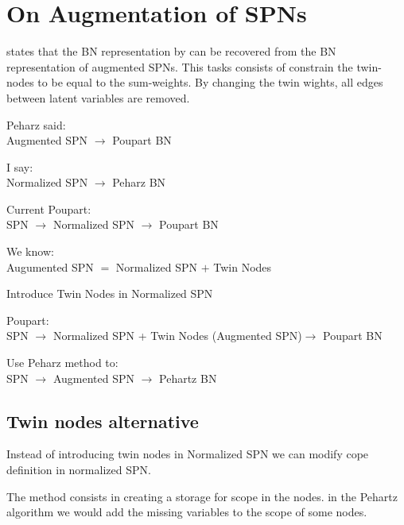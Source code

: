 \clearpage
\section{On Augmentation of SPNs}

\cite{peharz2015theoretical} states that the BN representation by \cite{zhao2015relationship} can be recovered from the BN representation of augmented SPNs.
This tasks consists of constrain the twin-nodes to be equal to the sum-weights.
By changing the twin wights, all edges between latent variables are removed.



Peharz said: \\
Augmented SPN $\rightarrow$ Poupart BN

I say: \\
Normalized SPN $\rightarrow$ Peharz BN

Current Poupart:\\
	SPN $\rightarrow$ Normalized SPN $\rightarrow$ Poupart BN

We know:\\
	Augumented SPN $=$ Normalized SPN $+$ Twin Nodes
	

Introduce Twin Nodes in Normalized SPN

Poupart:\\
	SPN $\rightarrow$ Normalized SPN + Twin Nodes (Augmented SPN)$\rightarrow$ Poupart BN
	
Use Peharz method to:\\
	SPN $\rightarrow$ Augmented SPN $\rightarrow$ Pehartz BN
	
\subsection{Twin nodes alternative}

Instead of introducing twin nodes in Normalized SPN we can modify cope definition in normalized SPN.

The method consists in creating a storage for scope in the nodes.
in the Pehartz algorithm we would add the missing variables to the scope of some nodes.